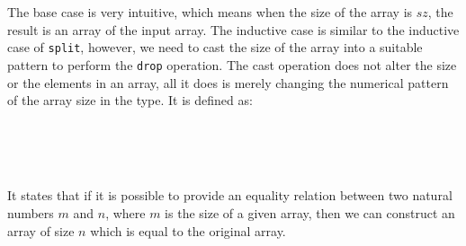 \documentclass{l4proj}
\begin{document}
The base case is very intuitive, which means when the size of the array is $sz$, the result is an array of the input array. The inductive case is similar to the inductive case of \texttt{split}, however, we need to cast the size of the array into a suitable pattern to perform the \texttt{drop} operation. The cast operation does not alter the size or the elements in an array, all it does is merely changing the numerical pattern of the array size in the type. It is defined as:
\begin{code}%
\>[0]\<%
\\
\>[0]\AgdaSpace{}%
\AgdaSymbol{:}\AgdaSpace{}%
\AgdaSymbol{\{}\AgdaSpace{}%
\AgdaSymbol{:}\AgdaSpace{}%
\AgdaSymbol{\}}\AgdaSpace{}%
\AgdaSpace{}%
\AgdaSymbol{\{}\AgdaSpace{}%
\AgdaSpace{}%
\AgdaSymbol{:}\AgdaSpace{}%
\AgdaSymbol{\}}\AgdaSpace{}%
\AgdaSpace{}%
\AgdaBound{\AgdaUnderscore{}}\AgdaSpace{}%
\AgdaSymbol{:}\AgdaSpace{}%
\AgdaSpace{}%
\AgdaSpace{}%
\AgdaSymbol{)}\AgdaSpace{}%
\AgdaSpace{}%
\AgdaSpace{}%
\AgdaSpace{}%
\AgdaSpace{}%
\AgdaSpace{}%
\AgdaSpace{}%
\AgdaSpace{}%
\<%
\\
\>[0]\AgdaSpace{}%
\AgdaSymbol{\{}\AgdaSymbol{\}}\AgdaSpace{}%
\AgdaSymbol{\{}\AgdaSymbol{\}}\AgdaSpace{}%
\AgdaSymbol{\{}\AgdaSymbol{\}}\AgdaSpace{}%
\AgdaSpace{}%
\AgdaInductiveConstructor{[]}\AgdaSpace{}%
\AgdaSymbol{=}\AgdaSpace{}%
\AgdaInductiveConstructor{[]}\<%
\\
\>[0]\AgdaSpace{}%
\AgdaSymbol{\{}\AgdaSymbol{\}}\AgdaSpace{}%
\AgdaSymbol{\{}\AgdaSpace{}%
\AgdaSymbol{\}}\AgdaSpace{}%
\AgdaSymbol{\{}\AgdaSpace{}%
\AgdaSymbol{\}}\AgdaSpace{}%
\AgdaSpace{}%
\AgdaSymbol{(}\AgdaSpace{}%
\AgdaSpace{}%
\AgdaSymbol{)}\AgdaSpace{}%
\AgdaSymbol{=}\AgdaSpace{}%
\AgdaSpace{}%
\AgdaSpace{}%
\AgdaSpace{}%
\AgdaSymbol{\{}\AgdaSymbol{\}}\AgdaSpace{}%
\AgdaSymbol{\{}\AgdaSymbol{\}}\AgdaSpace{}%
\AgdaSymbol{\{}\AgdaSymbol{\}}\AgdaSpace{}%
\AgdaSymbol{(}\AgdaSpace{}%
\AgdaSpace{}%
\AgdaSymbol{)}\AgdaSpace{}%
\<%
\end{code}
It states that if it is possible to provide an equality relation between two natural numbers $m$ and $n$, where $m$ is the size of a given array, then we can construct an array of size $n$ which is equal to the original array.
\end{document}
